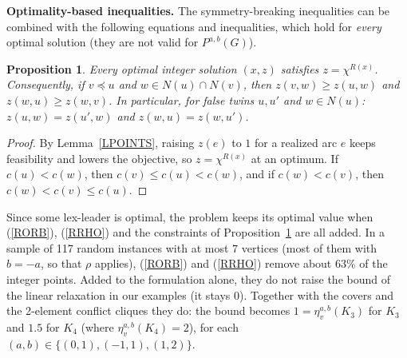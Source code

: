 \documentclass[a4paper,11pt]{article}
\newcommand{\etav}{\eta_v^{a,b}}
\newtheorem{prop}{Proposition}
\theoremstyle{definition}
\begin{document}
\noindent\textbf{Optimality-based inequalities.} The symmetry-breaking inequalities can be combined with the following equations and inequalities,
which hold for \emph{every} optimal solution (they are not valid for $P^{a,b}(G)$).

\begin{prop} \label{POPT}
Every optimal integer solution $(x,z)$ satisfies $z = \chi^{R(x)}$. Consequently, if $v \preceq u$ and $w \in N(u) \cap N(v)$, then
$z(v,w) \geq z(u,w)$ and $z(w,u) \geq z(w,v)$. In particular, for false twins $u, u'$ and $w \in N(u)$: $z(u,w) = z(u',w)$ and $z(w,u) = z(w,u')$.
\end{prop}
\begin{proof}
By Lemma~\ref{LPOINTS}, raising $z(e)$ to $1$ for a realized arc $e$ keeps feasibility and lowers the objective, so $z = \chi^{R(x)}$ at an optimum. If
$c(u) < c(w)$, then $c(v) \leq c(u) < c(w)$, and if $c(w) < c(v)$, then $c(w) < c(v) \leq c(u)$.
\end{proof}

Since some lex-leader is optimal, the problem keeps its optimal value when (\ref{RORB}), (\ref{RRHO}) and the constraints of Proposition~\ref{POPT} are
all added. In a sample of 117 random instances with at most $7$ vertices (most of them with $b = -a$, so that $\rho$ applies), (\ref{RORB}) and (\ref{RRHO})
remove about $63\%$ of the integer points.
Added to the formulation alone, they do not raise the bound of the linear relaxation in our examples (it stays $0$). Together with the covers and
the 2-element conflict cliques they do: the bound becomes $1 = \etav(K_3)$ for $K_3$ and $1.5$ for $K_4$ (where $\etav(K_4) = 2$), for each
$(a,b) \in \{(0,1),(-1,1),(1,2)\}$.

\medskip
\end{document}
